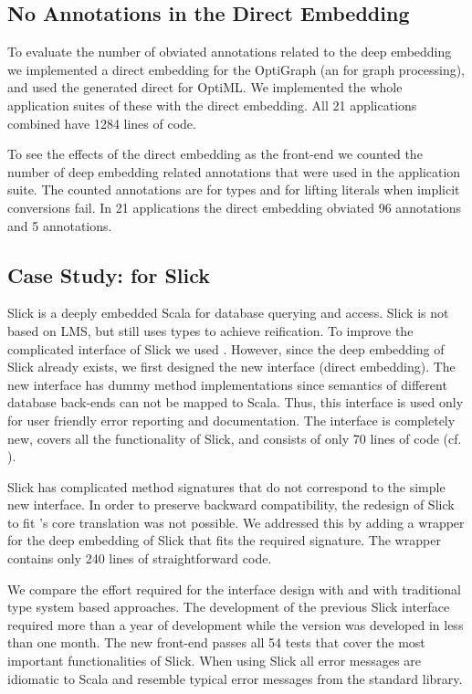 \subsection{No Annotations in the Direct Embedding}
\label{subsec:correctness}

To evaluate the number of obviated annotations related to the deep embedding we
implemented a direct embedding for the OptiGraph \edsl (an \edsl for graph
processing), and used the generated direct \edsl for OptiML. We implemented
the whole application suites of these \edsls with the direct embedding. All 21
applications combined have 1284 lines of code.

To see the effects of the direct embedding as the front-end we counted the
number of deep embedding related annotations that were used in the application
suite. The counted annotations are  for types and 
for lifting literals when implicit conversions fail. In 21 applications
the direct embedding obviated 96  annotations and 5
 annotations.

\subsection{Case Study: \yy for Slick}
\label{subsec:slick}
Slick is a deeply embedded Scala \edsl for database querying and access. Slick
is not based on LMS, but still uses  types to achieve reification.
To improve the complicated interface of Slick we used \yy.
However, since the deep embedding of Slick already exists, we first designed the new
interface (direct embedding). The new interface has dummy method
implementations since semantics of different database back-ends can not be
mapped to Scala. Thus, this interface is used only for user friendly error reporting and
documentation. The interface is completely new, covers all the functionality of Slick,
 and consists of only 70 lines of code (cf. \cite{techrep}).

Slick has complicated method signatures that do not correspond to the simple new
interface. In order to preserve backward compatibility, the redesign of Slick to
fit \yy's core translation was not possible. We addressed this by adding a
wrapper for the deep embedding of Slick that fits the required signature.
The wrapper contains only 240 lines of straightforward code.

We compare the effort required for the interface design with \yy and with
traditional type system based approaches. The development of the previous Slick
interface required more than a year of development while the \yy version was
developed in less than one month. The new front-end passes all 54 tests that cover the
most important functionalities of Slick. When using Slick all error messages are
idiomatic to Scala and resemble typical error messages from the standard
library.

